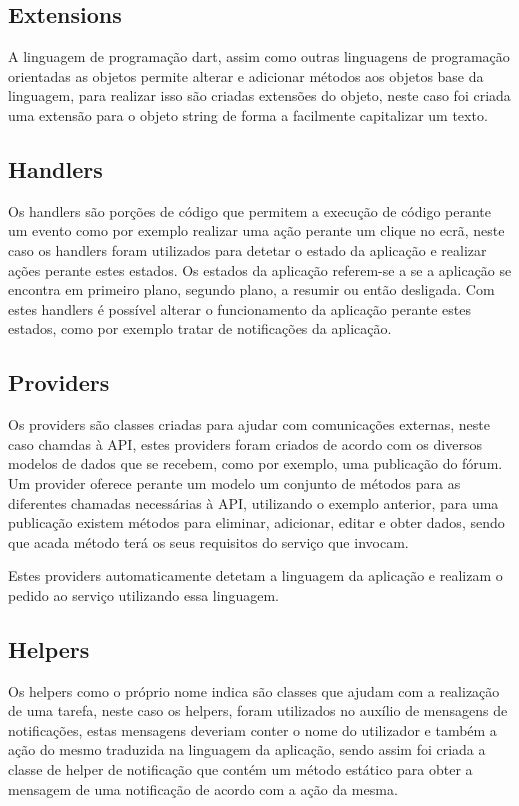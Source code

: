 \subsection{Extensions}
A linguagem de programação dart, assim como outras linguagens de programação orientadas as objetos permite alterar e adicionar métodos aos objetos base da linguagem, para realizar isso são criadas extensões do objeto, neste caso foi criada uma extensão para o objeto string de forma a facilmente capitalizar um texto.

\subsection{Handlers}
Os handlers são porções de código que permitem a execução de código perante um evento como por exemplo realizar uma ação perante um clique no ecrã, neste caso os handlers foram utilizados para detetar o estado da aplicação e realizar ações perante estes estados. Os estados da aplicação referem-se a se a aplicação se encontra em primeiro plano, segundo plano, a resumir ou então desligada. Com estes handlers é possível alterar o funcionamento da aplicação perante estes estados, como por exemplo tratar de notificações da aplicação.

\subsection{Providers}
Os providers são classes criadas para ajudar com comunicações externas, neste caso chamdas à API, estes providers foram criados de acordo com os diversos modelos de dados que se recebem, como por exemplo, uma publicação do fórum. Um provider oferece perante um modelo um conjunto de métodos para as diferentes chamadas necessárias à API, utilizando o exemplo anterior, para uma publicação existem métodos para eliminar, adicionar, editar e obter dados, sendo que acada método terá os seus requisitos do serviço que invocam.

Estes providers automaticamente detetam a linguagem da aplicação e realizam o pedido ao serviço utilizando essa linguagem.

\subsection{Helpers}
Os helpers como o próprio nome indica são classes que ajudam com a realização de uma tarefa, neste caso os helpers, foram utilizados no auxílio de mensagens de notificações, estas mensagens deveriam conter o nome do utilizador e também a ação do mesmo traduzida na linguagem da aplicação, sendo assim foi criada a classe de helper de notificação que contém um método estático para obter a mensagem de uma notificação de acordo com a ação da mesma.
